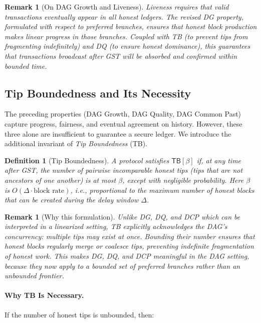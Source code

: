 \documentclass[11pt]{article}
\newtheorem{definition}[theorem]{Definition}
\newtheorem{remark}[theorem]{Remark}
\begin{document}
\begin{remark}[On DAG Growth and Liveness]
Liveness requires that valid transactions eventually appear in all honest ledgers. 
The revised DG property, formulated with respect to preferred branches, 
ensures that honest block production makes linear progress in those branches. 
Coupled with TB (to prevent tips from fragmenting indefinitely) 
and DQ (to ensure honest dominance), this guarantees that transactions 
broadcast after GST will be absorbed and confirmed within bounded time. 
\end{remark}








\subsection{Tip Boundedness and Its Necessity}
\label{subsec:tip-boundedness}

The preceding properties (DAG Growth, DAG Quality, DAG Common Past) capture
progress, fairness, and eventual agreement on history. However, these three
alone are insufficient to guarantee a secure ledger. We introduce the additional
invariant of \emph{Tip Boundedness} (TB).

\begin{definition}[Tip Boundedness]
A protocol satisfies $\mathsf{TB}[\beta]$ if, at any time after GST, the number
of pairwise \emph{incomparable honest tips} (tips that are not ancestors of one
another) is at most $\beta$, except with negligible probability. Here $\beta$ is
$O(\Delta \cdot \text{block rate})$, i.e., proportional to the maximum number of
honest blocks that can be created during the delay window $\Delta$.
\end{definition}

\begin{remark}[Why this formulation]
Unlike DG, DQ, and DCP which can be interpreted in a linearized setting,
TB explicitly acknowledges the DAG’s concurrency: multiple tips may
exist at once. Bounding their number ensures that honest blocks regularly
\emph{merge or coalesce} tips, preventing indefinite fragmentation of honest
work. This makes DG, DQ, and DCP meaningful in the DAG setting, because they
now apply to a bounded set of preferred branches rather than an unbounded
frontier.
\end{remark}

\paragraph{Why TB Is Necessary.}
If the number of honest tips is unbounded, then:
\end{document}
